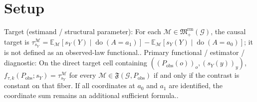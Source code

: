 \documentclass{article}
\begin{document}
\section{Setup}

Target (estimand / structural parameter): For each \(\mathcal M\in\mathfrak M_{+}^{\mathrm{rm}}(\mathcal G)\), the causal target is \(\tau_{s_Y}^{\mathcal M}=\mathbb E_{\mathcal M}[s_Y(Y)\mid\operatorname{do}(A=a_1)]-\mathbb E_{\mathcal M}[s_Y(Y)\mid\operatorname{do}(A=a_0)]\); it is not defined as an observed-law functional..
Primary functional / estimator / diagnostic: On the direct target cell containing \(((P_{\mathrm{obs}}(o))_o,(s_Y(y))_y)\), \(f_{\tau,k}(P_{\mathrm{obs}};s_Y)=\tau_{s_Y}^{\mathcal M}\) for every \(\mathcal M\in\mathfrak F(\mathcal G,P_{\mathrm{obs}})\) if and only if the contrast is constant on that fiber. If all coordinates at \(a_0\) and \(a_1\) are identified, the coordinate sum remains an additional sufficient formula..
\end{document}
